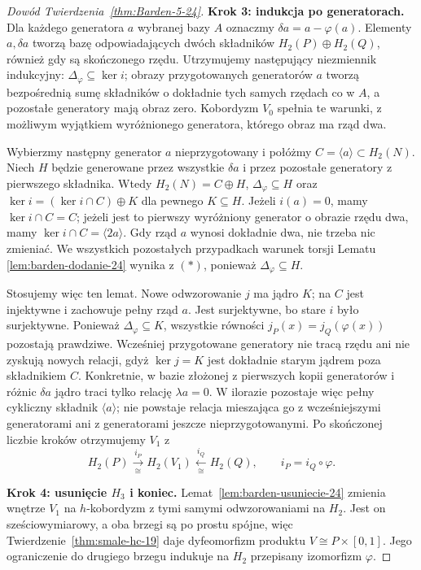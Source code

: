 \begin{proof}[Dowód Twierdzenia~\ref{thm:Barden-5-24}]
\textbf{Krok 3: indukcja po generatorach.}
Dla każdego generatora $a$ wybranej
bazy $A$ oznaczmy
$\delta a=a-\varphi(a)$.
Elementy $a,\delta a$ tworzą bazę
odpowiadających dwóch składników
$H_2(P)\oplus H_2(Q)$, również gdy
są skończonego rzędu. Utrzymujemy
następujący niezmiennik indukcyjny:
$\Delta_\varphi\subseteq\ker i$;
obrazy przygotowanych generatorów
$a$ tworzą bezpośrednią sumę
składników o dokładnie tych samych
rzędach co w $A$, a pozostałe
generatory mają obraz zero.
Kobordyzm $V_0$ spełnia te warunki,
z możliwym wyjątkiem wyróżnionego
generatora, którego obraz ma rząd dwa.

Wybierzmy następny generator $a$
nieprzygotowany i połóżmy
$C=\langle a\rangle\subset H_2(N)$.
Niech $H$ będzie generowane przez
wszystkie $\delta a$ i przez pozostałe
generatory z pierwszego składnika.
Wtedy $H_2(N)=C\oplus H$,
$\Delta_\varphi\subseteq H$ oraz
$\ker i=(\ker i\cap C)\oplus K$
dla pewnego $K\subseteq H$.
Jeżeli $i(a)=0$, mamy
$\ker i\cap C=C$; jeżeli jest to
pierwszy wyróżniony generator o
obrazie rzędu dwa, mamy
$\ker i\cap C=\langle2a\rangle$.
Gdy rząd $a$ wynosi dokładnie dwa,
nie trzeba nic zmieniać.
We wszystkich pozostałych przypadkach
warunek torsji Lematu
\ref{lem:barden-dodanie-24} wynika
z $(*)$, ponieważ $\Delta_\varphi
\subseteq H$.

Stosujemy więc ten lemat.
Nowe odwzorowanie $j$ ma jądro $K$;
na $C$ jest injektywne i zachowuje
pełny rząd $a$. Jest surjektywne,
bo stare $i$ było surjektywne.
Ponieważ $\Delta_\varphi\subseteq K$,
wszystkie równości
$j_P(x)=j_Q(\varphi(x))$ pozostają
prawdziwe. Wcześniej przygotowane
generatory nie tracą rzędu ani
nie zyskują nowych relacji,
gdyż $\ker j=K$ jest dokładnie
starym jądrem poza składnikiem $C$.
Konkretnie, w bazie złożonej z pierwszych kopii
generatorów i różnic $\delta a$ jądro traci tylko
relację $\lambda a=0$. W ilorazie pozostaje więc
pełny cykliczny składnik $\langle a\rangle$;
nie powstaje relacja mieszająca go z wcześniejszymi
generatorami ani z generatorami jeszcze nieprzygotowanymi.
Po skończonej liczbie kroków
otrzymujemy $V_1$ z
\[
 H_2(P)\xrightarrow[\cong]{i_P}H_2(V_1)
 \xleftarrow[\cong]{i_Q}H_2(Q),
 \qquad i_P=i_Q\circ\varphi.
\]

\textbf{Krok 4: usunięcie $H_3$ i koniec.}
Lemat~\ref{lem:barden-usuniecie-24}
zmienia wnętrze $V_1$ na
$h$-kobordyzm z tymi samymi
odwzorowaniami na $H_2$.
Jest on sześciowymiarowy,
a oba brzegi są po prostu spójne,
więc Twierdzenie~\ref{thm:smale-hc-19}
daje dyfeomorfizm produktu
$V\cong P\times[0,1]$.
Jego ograniczenie do drugiego
brzegu indukuje na $H_2$
przepisany izomorfizm $\varphi$.
\end{proof}

